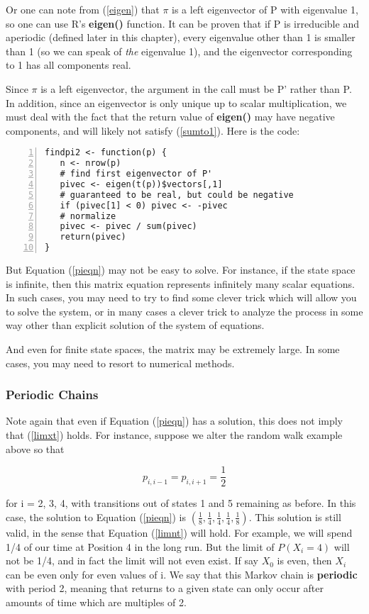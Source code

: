 Or one can note from (\ref{eigen}) that $\pi$ is a left eigenvector of P
with eigenvalue 1, so one can use R's {\bf eigen()} function.  It can be
proven that if P is irreducible and aperiodic (defined later in this
chapter), every eigenvalue other than 1 is smaller than 1 (so we can
speak of {\it the} eigenvalue 1), and the eigenvector corresponding to 1
has all components real.  

Since $\pi$ is a left eigenvector, the argument in the call must be P'
rather than P.  In addition, since an eigenvector is only unique up to
scalar multiplication, we must deal with the fact that the return value
of {\bf eigen()} may have negative components, and will likely not
satisfy (\ref{sumto1}).  Here is the code:

\begin{Verbatim}[fontsize=\relsize{-2},numbers=left]
findpi2 <- function(p) {
   n <- nrow(p)
   # find first eigenvector of P'
   pivec <- eigen(t(p))$vectors[,1]
   # guaranteed to be real, but could be negative
   if (pivec[1] < 0) pivec <- -pivec
   # normalize
   pivec <- pivec / sum(pivec)
   return(pivec)
}
\end{Verbatim}

But Equation (\ref{pieqn}) may not be easy to solve.  For instance, if
the state space is infinite, then this matrix equation represents
infinitely many scalar equations.  In such cases, you may need to try to
find some clever trick which will allow you to solve the system, or in
many cases a clever trick to analyze the process in some way other than
explicit solution of the system of equations.

And even for finite state spaces, the matrix may be extremely large.  In
some cases, you may need to resort to numerical methods. 

\subsubsection{Periodic Chains}

Note again that even if Equation (\ref{pieqn}) has a solution, this does
not imply that (\ref{limxt}) holds. For instance, suppose we alter the
random walk example above so that

\begin{equation}
p_{i,i-1}=p_{i,i+1}=\frac{1}{2}
\end{equation}  

for i = 2, 3, 4, with transitions out of states 1 and 5 remaining as
before.  In this case, the solution to Equation (\ref{pieqn}) is
$(\frac{1}{8},\frac{1}{4},\frac{1}{4},\frac{1}{4},\frac{1}{8})$.  This
solution is still valid, in the sense that Equation (\ref{limnt}) will
hold. For example, we will spend 1/4 of our time at Position 4 in the
long run.  But the limit of $P(X_{i}=4)$ will not be 1/4, and in fact
the limit will not even exist. If say $X_{0}$ is even, then $X_{i}$ can
be even only for even values of i.  We say that this Markov chain is
{\bf periodic} with period 2, meaning that returns to a given state can
only occur after amounts of time which are multiples of 2.

